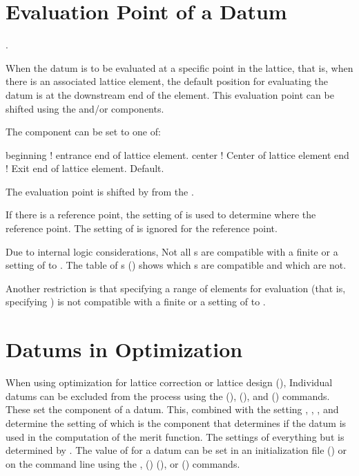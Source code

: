 \section{Evaluation Point of a Datum}.
\label{s:dat.eval}

When the datum is to be evaluated at a specific point in the lattice, that is, when there
is an associated lattice element, the default position for evaluating the datum is at the
downstream end of the element. This evaluation point can be shifted using the
 and/or  components. 

The  component can be set to one of:
\begin{example}
  beginning   ! entrance end of lattice element.
  center      ! Center of lattice element
  end         ! Exit end of lattice element. Default.
\end{example}
The evaluation point is shifted by  from the .

If there is a reference point, the setting of  is used to determine where
the reference point. The setting of  is ignored for the reference point.

Due to internal logic considerations, Not all s are compatible with a finite
 or a setting of  to . The table of s
() shows which s are compatible and which are not.

Another restriction is that specifying a range of elements for evaluation (that is,
specifying  ) is not compatible with a finite
 or a setting of  to .

\section{Datums in Optimization}
\label{s:datum.opt}

When using optimization for lattice correction or lattice design (), Individual datums
can be excluded from the process using the  (), 
(), and  () commands. These set the  component of
a datum. This, combined with the setting , , , and
 determine the setting of  which is the component that determines if the
datum is used in the computation of the merit function. The settings of everything but
 is determined by \tao. The value of  for a datum can be set in an
initialization file () or on the command line using the , ()  (), or
 () commands.

